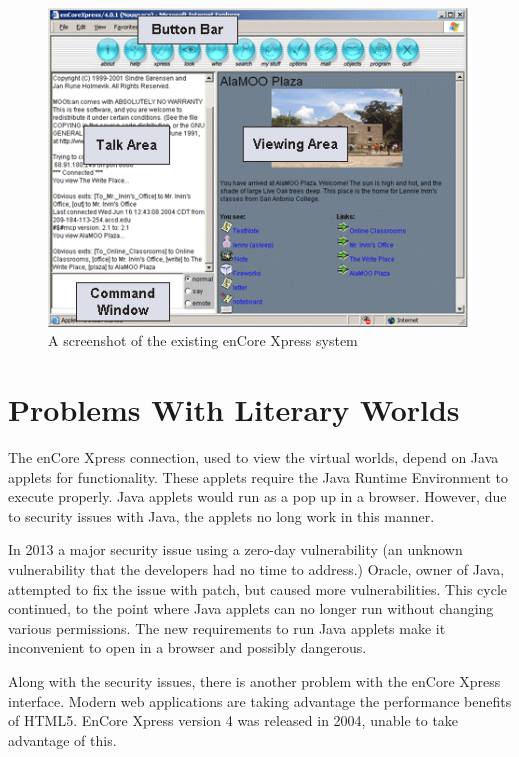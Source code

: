 \documentclass[12pt, letterpaper]{report}
\begin{document}
\par
\begin{figure}[htp]
\centering
\includegraphics{enCoreScreen.png}
\caption{A screenshot of the existing enCore Xpress system \cite{xpress}}
\label{fig1}
\label{overflow}
\end{figure}

\section{Problems With Literary Worlds}
\par
The enCore Xpress connection, used to view the virtual worlds, depend on Java applets for functionality.  These applets require the Java Runtime Environment to execute properly. Java applets would run as a pop up in a browser.  However, due to security issues with Java, the applets no long work in this manner.

\par
In 2013 a major security issue using a zero-day vulnerability (an unknown vulnerability that the developers had no time to address.)  Oracle, owner of Java, attempted to fix the issue with patch, but caused more vulnerabilities.  This cycle continued, to the point where Java applets can no longer run without changing various permissions.
The new requirements to run Java applets make it inconvenient to open in a browser and possibly dangerous.

\par
Along with the security issues, there is another problem with the enCore Xpress interface.  Modern web applications are taking advantage the performance benefits of HTML5.  EnCore Xpress version 4 was released in 2004, unable to take advantage of this.  
\end{document}
